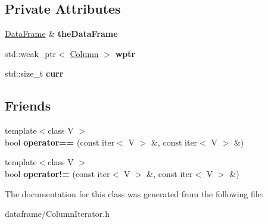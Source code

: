 \subsection*{Private Attributes}
\begin{DoxyCompactItemize}
\item 
\mbox{\label{classDataFrame_1_1ColumnIterator_ab919f4db40a13be59da3e6a6f95b1607}} 
\hyperlink{classDataFrame}{Data\+Frame} \& {\bfseries the\+Data\+Frame}
\item 
\mbox{\label{classDataFrame_1_1ColumnIterator_a7c35123239e3d9e9181abe7092a03d8c}} 
std\+::weak\+\_\+ptr$<$ \hyperlink{classColumn}{Column} $>$ {\bfseries wptr}
\item 
\mbox{\label{classDataFrame_1_1ColumnIterator_af67eee4d36c0068db457317aa2dad55f}} 
std\+::size\+\_\+t {\bfseries curr}
\end{DoxyCompactItemize}
\subsection*{Friends}
\begin{DoxyCompactItemize}
\item 
\mbox{\label{classDataFrame_1_1ColumnIterator_a9e9de084e6237f0757aff0f5734d5b61}} 
{\footnotesize template$<$class V $>$ }\\bool {\bfseries operator==} (const iter$<$ V $>$ \&, const iter$<$ V $>$ \&)
\item 
\mbox{\label{classDataFrame_1_1ColumnIterator_aa108d2c38bd5458546a49474e799e6a5}} 
{\footnotesize template$<$class V $>$ }\\bool {\bfseries operator!=} (const iter$<$ V $>$ \&, const iter$<$ V $>$ \&)
\end{DoxyCompactItemize}


The documentation for this class was generated from the following file\+:\begin{DoxyCompactItemize}
\item 
dataframe/Column\+Iterator.\+h\end{DoxyCompactItemize}
